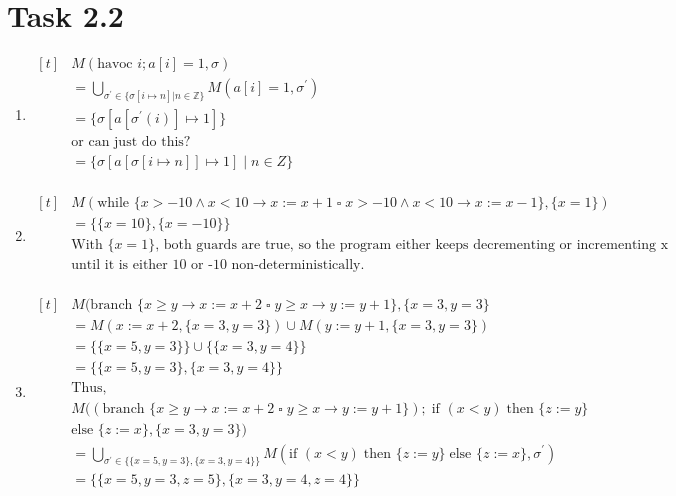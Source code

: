 \documentclass{article}
\newcommand{\Z}{\mathbb{Z}}
\begin{document}
	\section{Task 2.2}
		\begin{enumerate}[label = {(\alph*)}]
			
			\item
			$\begin{aligned}[t]
				&M(\text{havoc }i; a[i] = 1, \sigma) \\
				&= \bigcup_{\sigma^{'} \in \{\sigma[i \mapsto n] | n \in \Z\}} M(a[i] = 1, \sigma^{'}) \\
				&= \{\sigma[a[\sigma^{'}(i)] \mapsto 1]\} \\
				&\text{or can just do this?} \\
				&= \{\sigma[a[\sigma[i \mapsto n]] \mapsto 1] \; | \; n \in Z\} \\
			\end{aligned}$
			
			\item
			$\begin{aligned}[t]
				&M(\text{while }\{x > -10 \land x < 10 \to x := x + 1 \; \square \; x > -10 \land x < 10 \to x := x - 1\}, \{x = 1\}) \\
				&= \{\{x = 10\}, \{x = -10\}\} \\
				&\text{With $\{x = 1\}$, both guards are true, so the program either keeps decrementing or incrementing x} \\ &\text{until it is either 10 or -10 non-deterministically.} \\
			\end{aligned}$
			
			\item
			$\begin{aligned}[t]
				&M(\text{branch }\{x \geq y \to x := x + 2 \; \square \; y \geq x \to y := y + 1\}, \{x = 3, y = 3\} \\
				&= M(x := x + 2, \{x = 3, y = 3\}) \cup M(y := y + 1, \{x = 3, y = 3\}) \\
				&= \{\{x = 5, y = 3\}\} \cup \{\{x = 3, y = 4\}\} \\
				&= \{\{x = 5, y = 3\}, \{x = 3, y = 4\}\} \\
				&\text{Thus,} \\
				&M((\text{branch }\{x \geq y \to x := x + 2 \; \square \; y \geq x \to y := y + 1\}); \; \text{if }(x < y) \; \text{then }\{z := y\} \\
				&\text{else }\{z := x\}, \{x = 3, y = 3\}) \\
				&= \bigcup_{\sigma^{'} \in \{\{x = 5, y = 3\}, \{x = 3, y = 4\}\}} M(\text{if }(x < y) \; \text{then }\{z := y\}\; \text{else }\{z := x\}, \sigma^{'})\\
				&= \{\{x = 5, y = 3, z = 5\}, \{x = 3, y = 4, z = 4\}\}
			\end{aligned}$
			
		\end{enumerate}
	
\end{document}
